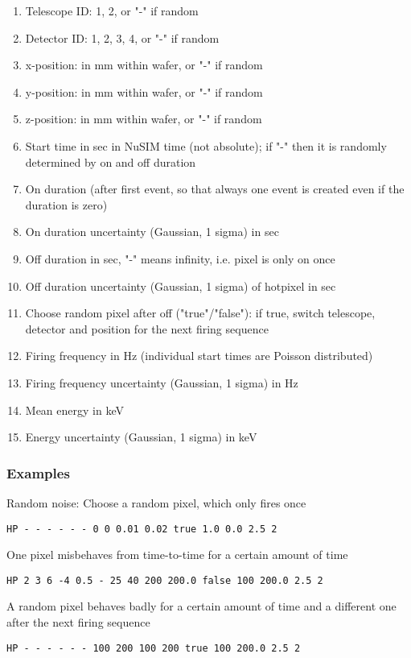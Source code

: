\begin{enumerate}
\item Telescope ID: 1, 2, or "-" if random
\item Detector ID: 1, 2, 3, 4, or "-" if random
\item x-position: in mm within wafer, or "-" if random
\item y-position: in mm within wafer, or "-" if random
\item z-position: in mm within wafer, or "-" if random
\item Start time in sec in NuSIM time (not absolute); if "-" then it is randomly determined by on and off duration 
\item On duration (after first event, so that always one event is created even if the duration is zero)
\item On duration uncertainty (Gaussian, 1 sigma) in sec
\item Off duration in sec, "-" means infinity, i.e. pixel is only on once
\item Off duration uncertainty (Gaussian, 1 sigma) of hotpixel in sec
\item Choose random pixel after off ("true"/"false"): if true, switch telescope, detector and position for the next firing sequence
\item Firing frequency in Hz (individual start times are Poisson distributed)
\item Firing frequency uncertainty (Gaussian, 1 sigma) in Hz
\item Mean energy in keV
\item Energy uncertainty (Gaussian, 1 sigma) in keV
\end{enumerate}

\subsubsection{Examples}

\noindent Random noise: Choose a random pixel, which only fires once
\begin{verbatim}
HP - - - - - - 0 0 0.01 0.02 true 1.0 0.0 2.5 2
\end{verbatim}

\noindent One pixel misbehaves from time-to-time for a certain amount of time
\begin{verbatim}
HP 2 3 6 -4 0.5 - 25 40 200 200.0 false 100 200.0 2.5 2
\end{verbatim}

\noindent A random pixel behaves badly for a certain amount of time and a different one after the next firing sequence
\begin{verbatim}
HP - - - - - - 100 200 100 200 true 100 200.0 2.5 2
\end{verbatim}

